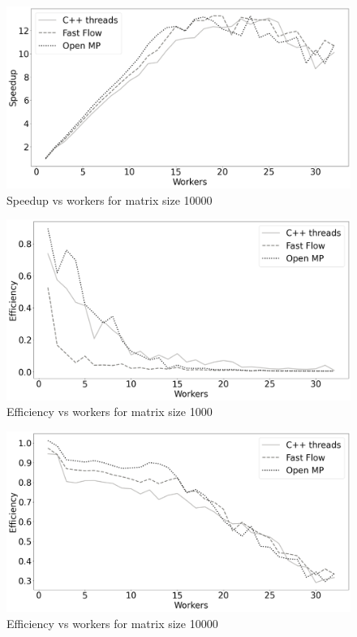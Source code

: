 \documentclass[12pt]{article}
\begin{document}
	\begin{figure}[H]
		\centering
		\includegraphics[width=13cm]{./images/speedup_vs_cores_10000}
		\caption{Speedup vs workers for matrix size 10000}
	\end{figure}

	\begin{figure}[H]
		\centering
		\includegraphics[width=13cm]{./images/efficiency_vs_cores_1000}
		\caption{Efficiency vs workers for matrix size 1000}
	\end{figure}

	\begin{figure}[H]
		\centering
		\includegraphics[width=13cm]{./images/efficiency_vs_cores_10000}
		\caption{Efficiency vs workers for matrix size 10000}
	\end{figure}
\end{document}
